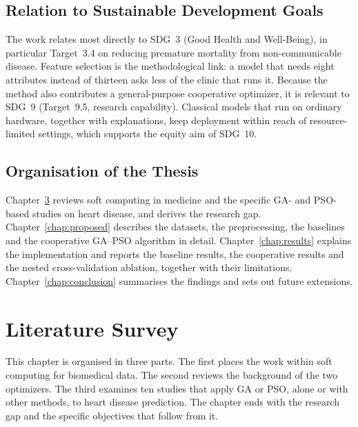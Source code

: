 \documentclass[MTech]{ugthesis}
\begin{document}
\section{Relation to Sustainable Development Goals}
The work relates most directly to \ac{SDG}~3 (Good Health and Well-Being), in particular Target~3.4 on reducing premature mortality from non-communicable disease. Feature selection is the methodological link: a model that needs eight attributes instead of thirteen asks less of the clinic that runs it. Because the method also contributes a general-purpose cooperative optimizer, it is relevant to SDG~9 (Target~9.5, research capability). Classical models that run on ordinary hardware, together with explanations, keep deployment within reach of resource-limited settings, which supports the equity aim of SDG~10.

\section{Organisation of the Thesis}
Chapter~\ref{chap:lit} reviews soft computing in medicine and the specific GA- and PSO-based studies on heart disease, and derives the research gap. Chapter~\ref{chap:proposed} describes the datasets, the preprocessing, the baselines and the cooperative GA--PSO algorithm in detail. Chapter~\ref{chap:results} explains the implementation and reports the baseline results, the cooperative results and the nested cross-validation ablation, together with their limitations. Chapter~\ref{chap:conclusion} summarises the findings and sets out future extensions.

\chapter{Literature Survey}
\label{chap:lit}

This chapter is organised in three parts. The first places the work within soft computing for biomedical data. The second reviews the background of the two optimizers. The third examines ten studies that apply GA or PSO, alone or with other methods, to heart disease prediction. The chapter ends with the research gap and the specific objectives that follow from it.
\end{document}

